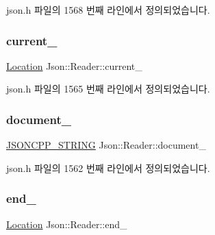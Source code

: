 json.\+h 파일의 1568 번째 라인에서 정의되었습니다.

\mbox{\label{class_json_1_1_reader_a2f2feb5201a26da7aa133d2f7434479b}} 
\subsubsection{\texorpdfstring{current\+\_\+}{current\_}}
{\footnotesize\ttfamily \hyperlink{class_json_1_1_reader_a46795b5b272bf79a7730e406cb96375a}{Location} Json\+::\+Reader\+::current\+\_\+\hspace{0.3cm}{\ttfamily [private]}}



json.\+h 파일의 1565 번째 라인에서 정의되었습니다.

\mbox{\label{class_json_1_1_reader_abf99e137bc92a93623dc97598702261a}} 
\subsubsection{\texorpdfstring{document\+\_\+}{document\_}}
{\footnotesize\ttfamily \hyperlink{json_8h_a1e723f95759de062585bc4a8fd3fa4be}{J\+S\+O\+N\+C\+P\+P\+\_\+\+S\+T\+R\+I\+NG} Json\+::\+Reader\+::document\+\_\+\hspace{0.3cm}{\ttfamily [private]}}



json.\+h 파일의 1562 번째 라인에서 정의되었습니다.

\mbox{\label{class_json_1_1_reader_a714793579cbf4ee7c5a7223d2c8d77c1}} 
\subsubsection{\texorpdfstring{end\+\_\+}{end\_}}
{\footnotesize\ttfamily \hyperlink{class_json_1_1_reader_a46795b5b272bf79a7730e406cb96375a}{Location} Json\+::\+Reader\+::end\+\_\+\hspace{0.3cm}{\ttfamily [private]}}



